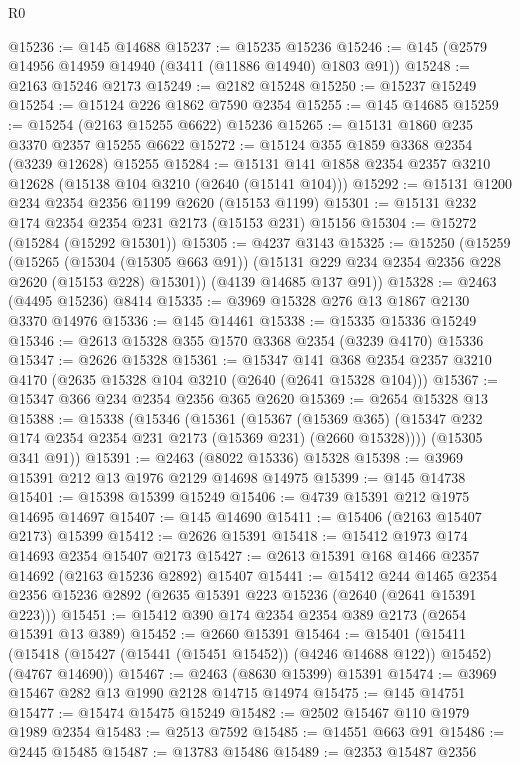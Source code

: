 \begin{lexlean}{R0}
\begin{coremodule}
@15236 := @145 @14688
@15237 := @15235 @15236
@15246 := @145 (@2579 @14956 @14959 @14940 (@3411 (@11886 @14940) @1803 @91))
@15248 := @2163 @15246 @2173
@15249 := @2182 @15248
@15250 := @15237 @15249
@15254 := @15124 @226 @1862 @7590 @2354
@15255 := @145 @14685
@15259 := @15254 (@2163 @15255 @6622) @15236
@15265 := @15131 @1860 @235 @3370 @2357 @15255 @6622
@15272 := @15124 @355 @1859 @3368 @2354 (@3239 @12628) @15255
@15284 := @15131 @141 @1858 @2354 @2357 @3210 @12628 (@15138 @104 @3210 (@2640 (@15141 @104)))
@15292 := @15131 @1200 @234 @2354 @2356 @1199 @2620 (@15153 @1199)
@15301 := @15131 @232 @174 @2354 @2354 @231 @2173 (@15153 @231) @15156
@15304 := @15272 (@15284 (@15292 @15301))
@15305 := @4237 @3143
@15325 := @15250
    (@15259
      (@15265
        (@15304 (@15305 @663 @91))
        (@15131 @229 @234 @2354 @2356 @228 @2620 (@15153 @228) @15301))
      (@4139 @14685 @137 @91))
@15328 := @2463 (@4495 @15236) @8414
@15335 := @3969 @15328 @276 @13 @1867 @2130 @3370 @14976
@15336 := @145 @14461
@15338 := @15335 @15336 @15249
@15346 := @2613 @15328 @355 @1570 @3368 @2354 (@3239 @4170) @15336
@15347 := @2626 @15328
@15361 := @15347
    @141
    @368
    @2354
    @2357
    @3210
    @4170
    (@2635 @15328 @104 @3210 (@2640 (@2641 @15328 @104)))
@15367 := @15347 @366 @234 @2354 @2356 @365 @2620
@15369 := @2654 @15328 @13
@15388 := @15338
    (@15346
      (@15361
        (@15367
          (@15369 @365)
          (@15347 @232 @174 @2354 @2354 @231 @2173 (@15369 @231) (@2660 @15328))))
      (@15305 @341 @91))
@15391 := @2463 (@8022 @15336) @15328
@15398 := @3969 @15391 @212 @13 @1976 @2129 @14698 @14975
@15399 := @145 @14738
@15401 := @15398 @15399 @15249
@15406 := @4739 @15391 @212 @1975 @14695 @14697
@15407 := @145 @14690
@15411 := @15406 (@2163 @15407 @2173) @15399
@15412 := @2626 @15391
@15418 := @15412 @1973 @174 @14693 @2354 @15407 @2173
@15427 := @2613 @15391 @168 @1466 @2357 @14692 (@2163 @15236 @2892) @15407
@15441 := @15412
    @244
    @1465
    @2354
    @2356
    @15236
    @2892
    (@2635 @15391 @223 @15236 (@2640 (@2641 @15391 @223)))
@15451 := @15412 @390 @174 @2354 @2354 @389 @2173 (@2654 @15391 @13 @389)
@15452 := @2660 @15391
@15464 := @15401
    (@15411 (@15418 (@15427 (@15441 (@15451 @15452)) (@4246 @14688 @122)) @15452) (@4767 @14690))
@15467 := @2463 (@8630 @15399) @15391
@15474 := @3969 @15467 @282 @13 @1990 @2128 @14715 @14974
@15475 := @145 @14751
@15477 := @15474 @15475 @15249
@15482 := @2502 @15467 @110 @1979 @1989 @2354
@15483 := @2513 @7592
@15485 := @14551 @663 @91
@15486 := @2445 @15485
@15487 := @13783 @15486
@15489 := @2353 @15487 @2356

\end{coremodule}
\end{lexlean}
